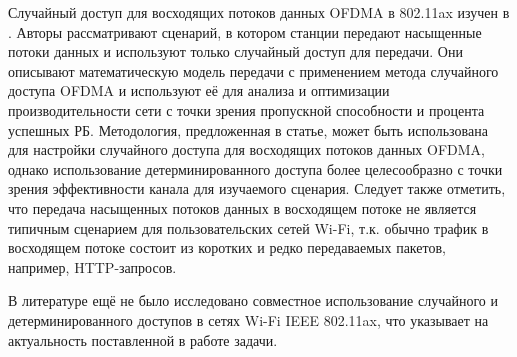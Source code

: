 Случайный доступ для восходящих потоков данных OFDMA в 802.11ax изучен в \cite{lanante2017performance}. 
Авторы рассматривают сценарий, в котором станции передают насыщенные потоки данных и используют только случайный доступ для передачи. 
Они описывают математическую модель передачи с применением метода случайного доступа OFDMA и используют её для анализа и оптимизации производительности сети с точки зрения пропускной способности и процента успешных РБ.
Методология, предложенная в статье, может быть использована для настройки случайного доступа для восходящих потоков данных OFDMA, однако использование детерминированного доступа более целесообразно с точки зрения эффективности канала для изучаемого сценария. Следует также отметить, что передача насыщенных потоков данных в восходящем потоке не является типичным сценарием для пользовательских сетей Wi-Fi, т.к. обычно трафик в восходящем потоке состоит из коротких и редко передаваемых пакетов, например, HTTP-запросов. 

В литературе ещё не было исследовано совместное использование случайного и детерминированного доступов в сетях Wi-Fi IEEE 802.11ax, что указывает на актуальность поставленной в работе задачи. 

